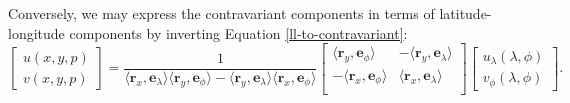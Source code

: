 Conversely, we may express the contravariant components in terms of
latitude-longitude components by inverting Equation \eqref{ll-to-contravariant}:
\begin{equation}
	\label{contravariant-to-ll}
	\begin{bmatrix}
		{u}(x,y,p) \\
		{v}(x,y,p)
	\end{bmatrix}
	=
	\frac{1}{\langle \boldsymbol{r}_x, \boldsymbol{e}_\lambda\rangle
	\langle \boldsymbol{r}_y, \boldsymbol{e}_\phi \rangle
	-\langle \boldsymbol{r}_y, \boldsymbol{e}_\lambda \rangle
	\langle \boldsymbol{r}_x, \boldsymbol{e}_\phi \rangle}
	\begin{bmatrix}
		  \langle \boldsymbol{r}_y, \boldsymbol{e}_\phi \rangle 
		&-\langle \boldsymbol{r}_y, \boldsymbol{e}_\lambda \rangle \\
		 -\langle \boldsymbol{r}_x, \boldsymbol{e}_\phi \rangle 
		& \langle \boldsymbol{r}_x, \boldsymbol{e}_\lambda \rangle \\
	\end{bmatrix}
	\begin{bmatrix}
		 u_\lambda (\lambda, \phi) \\
		 v_\phi (\lambda, \phi) 
	\end{bmatrix}.
\end{equation}

